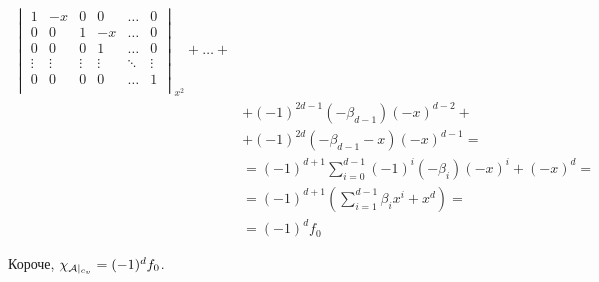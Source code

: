 \documentclass[main]{subfiles}
\begin{document}
\begin{align*}
{\begin{vmatrix}
                                                                     1      & -x     & 0      & 0      & \ldots & 0      \\
                                                                     0      & 0      & 1      & -x     & \ldots & 0      \\
                                                                     0      & 0      & 0      & 1      & \ldots & 0      \\
                                                                     \vdots & \vdots & \vdots & \vdots & \ddots & \vdots \\
                                                                     0      & 0      & 0      & 0      & \ldots & 1      \\
                                                                 \end{vmatrix}}_{x^2} + \ldots + \\
                        & + (-1)^{2d-1}(-\beta_{d-1})(-x)^{d-2} +                                                \\
                        & + (-1)^{2d}(-\beta_{d-1}-x)(-x)^{d-1} =                                                \\
                        & = (-1)^{d+1} \sum_{i=0}^{d-1} (-1)^i (-\beta_i)(-x)^i + (-x)^d =                       \\
                        & = (-1)^{d+1}(\sum_{i=1}^{d-1} \beta_i x^i + x^d) =                                     \\
                        & = (-1)^d f_0
\end{align*}

Короче, $\chi_{\mathcal{A} |_{c_v}} = (-1)^d f_0$.
\end{document}
